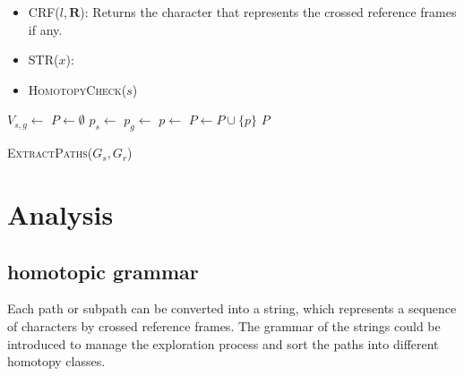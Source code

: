 \documentclass[letterpaper, 10 pt, conference]{ieeeconf}
\begin{document}
\begin{itemize}
	\item \textsc{CRF}($ l, \bm{R} $):
	Returns the character that represents the crossed reference frames if any.
	\item \textsc{STR}($ x $):	
	\item \textsc{HomotopyCheck}{($ s $)}
\end{itemize}

\begin{algorithm}
	\begin{algorithmic}[1]
		\State $ V_{s,g} \leftarrow $ 
		\State $ P \leftarrow \emptyset $
			\State $ p_{s} \leftarrow $ 
			\State $ p_{g} \leftarrow $ 
			\State $ p \leftarrow $ 
			\State $ P \leftarrow P \cup \{ p \} $
		\EndFor
		\Return $ P $
	\end{algorithmic}
	\caption{ \textsc{ExtractPaths}($ G_{s}, G_{r} $) }
	\label{alg:harrt:binding}
\end{algorithm}


\section{Analysis}
\label{sec:analysis}

\subsection{homotopic grammar}

Each path or subpath can be converted into a string, which represents a sequence of characters by crossed reference frames.
The grammar of the strings could be introduced to manage the exploration process and sort the paths into different homotopy classes.
\end{document}
